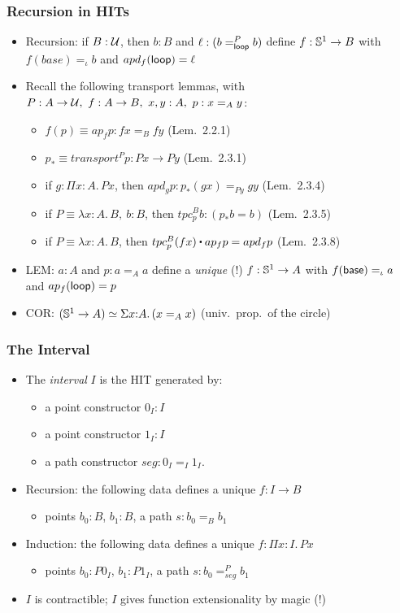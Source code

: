 \documentclass[handout]{beamer}
\newcommand{\depi}[3]{\Pi{#1{:}#2.\,#3}}
\newcommand{\sigm}[3]{\Sigma{#1{:}#2.\,#3}}
\newcommand{\lamt}[3]{\lambda{#1{:}#2.\,#3}}
\newcommand{\UU}{{\cal U}}
\newcommand{\ct}{%
  \mathchoice{\mathbin{\raisebox{0.5ex}{$\displaystyle\centerdot$}}}%
             {\mathbin{\raisebox{0.5ex}{$\centerdot$}}}%
             {\mathbin{\raisebox{0.25ex}{$\scriptstyle\,\centerdot\,$}}}%
             {\mathbin{\raisebox{0.1ex}{$\scriptscriptstyle\,\centerdot\,$}}}
}
\begin{document}
  \frame
  {
    \frametitle{Recursion in HITs}

    \begin{itemize}[<+->]
    \item Recursion: if ${B}:\UU$, %
    then $b:B$ and $\ell: (b =^P_{\mathsf{loop}} b)$ define $f:{\mathbb{S}^1}\to{B}$
             with $f(base) =_\iota b$ and $apd_f(\mathsf{loop}) = \ell$
    \item Recall the following transport lemmas, with 
    $P:A\to\UU,~f:A\to B,~x,y:A,~p : x=_A y$:
    \begin{itemize}
\item $f(p)\equiv ap_f p : fx =_B fy$  (Lem.\ 2.2.1)
\item $p_* \equiv transport^P p : Px \to Py$  (Lem.\ 2.3.1)
\item if $g:\depi{x}{A}{Px}$, then $apd_g p : p_*(gx) =_{Py} gy$  (Lem.\ 2.3.4)
\item if $P\equiv\lamt{x}{A}{B},~{b:B}$, then $tpc^B_p b : {(p_* b = b)}$ (Lem.\ 2.3.5)
\item if $P\equiv\lamt{x}{A}{B}$, then $tpc^B_p (fx) \ct ap_f p = apd_f p$ (Lem.\ 2.3.8)
\end{itemize}
    \item LEM: $a:A$ and $p: a =_A a$ define a \emph{unique} (!) $f: \mathbb{S}^1 \to A$ 
             with $f(\mathsf{base}) =_\iota a$ and $ap_f(\mathsf{loop})= p$ %
    \item COR: $(\Sn^1 \to A) \simeq \sigm{x}{A}{(x =_A x)}$ (univ.\ prop.\ of the circle)
    \end{itemize}
  }
   
 \frame
  {
    \frametitle{The Interval}
    
\begin{itemize}    
    \item The \emph{interval} $I$ is the HIT generated by:
\begin{itemize}
\item a point constructor $0_I :I$
\item a point constructor $1_I :I$
\item a path constructor $seg : 0_I =_{I} 1_I$.
\end{itemize}
    \item Recursion: the following data defines a unique $f:I\to B$
\begin{itemize}
\item points $b_0 :B$, $b_1 :B$, a path $s : b_0 =_{B} b_1$
\end{itemize}
    \item Induction: the following data defines a unique $f:\depi{x}{I}{Px}$
\begin{itemize}
\item points $b_0 : P0_I$, $b_1 : P1_I$, a path $s : b_0 =^P_{seg} b_1$
\end{itemize}
    \item $I$ is contractible; $I$ gives function extensionality by magic (!) 
    \end{itemize}
  }
  
\end{document}
